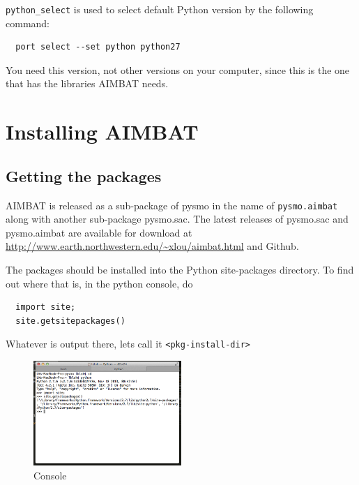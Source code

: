 \documentclass[letterpaper,10pt]{article}
\begin{document}
\verb"python_select" is used to select default Python version by the following command:

\begin{verbatim}
  port select --set python python27
\end{verbatim}

You need this version, not other versions on your computer, since this is the one that has the libraries AIMBAT needs.




\section{Installing AIMBAT}


\subsection{Getting the packages}

AIMBAT is released as a sub-package of pysmo in the name of \verb"pysmo.aimbat" along with
another sub-package pysmo.sac. The latest releases of pysmo.sac and pysmo.aimbat are
available for download at \url{http://www.earth.northwestern.edu/~xlou/aimbat.html} and Github. 

The packages should be installed into the Python site-packages directory. To find out where that is, in the python console, do

\begin{verbatim}
  import site;
  site.getsitepackages()
\end{verbatim}

Whatever is output there, lets call it \verb"<pkg-install-dir>"

\begin{figure}[h!]
  \centering
  \includegraphics[width=0.5\textwidth]{images/site_package_location}
  \caption{Console}
  \label{fig:site_package_location}
\end{figure}
\end{document}
